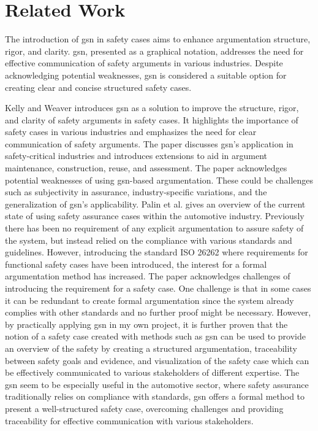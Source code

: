 \section*{Related Work}
    The introduction of \ac{gsn} in safety cases aims to enhance argumentation structure, rigor, and clarity. \ac{gsn}, presented as a graphical notation, addresses the need for effective communication of safety arguments in various industries. Despite acknowledging potential weaknesses, \ac{gsn} is considered a suitable option for creating clear and concise structured safety cases. 

    Kelly and Weaver \cite{kelly2004goal} introduces \ac{gsn} as a solution to improve the structure, rigor, and clarity of safety arguments in safety cases. It highlights the importance of safety cases in various industries and emphasizes the need for clear communication of safety arguments. The paper discusses \ac{gsn}'s application in safety-critical industries and introduces extensions to aid in argument maintenance, construction, reuse, and assessment. The paper acknowledges potential weaknesses of using \ac{gsn}-based argumentation. These could be challenges such as subjectivity in assurance, industry-specific variations, and the generalization of \ac{gsn}'s applicability. Palin et al. \cite{palin2011iso} gives an overview of the current state of using safety assurance cases within the automotive industry. Previously there has been no requirement of any explicit argumentation to assure safety of the system, but instead relied on the compliance with various standards and guidelines. However, introducing the standard ISO 26262 where requirements for functional safety cases have been introduced, the interest for a formal argumentation method has increased. The paper acknowledges challenges of introducing the requirement for a safety case. One challenge is that in some cases it can be redundant to create formal argumentation since the system already complies with other standards and no further proof might be necessary. However, by practically applying \ac{gsn} in my own project, it is further proven that the notion of a safety case created with methods such as \ac{gsn} can be used to provide an overview of the safety by creating a structured argumentation, traceability between safety goals and evidence, and visualization of the safety case which can be effectively communicated to various stakeholders of different expertise. The \ac{gsn} seem to be especially useful in the automotive sector, where safety assurance traditionally relies on compliance with standards, \ac{gsn} offers a formal method to present a well-structured safety case, overcoming challenges and providing traceability for effective communication with various stakeholders.